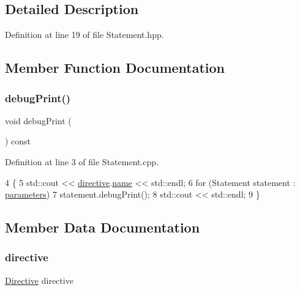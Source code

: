 \subsection{Detailed Description}


Definition at line 19 of file Statement.\+hpp.



\subsection{Member Function Documentation}
\mbox{\label{classft_1_1_statement_ad5cb0ada03653eb2e1c8947f05c07ad6}} 
\subsubsection{\texorpdfstring{debug\+Print()}{debugPrint()}}
{\footnotesize\ttfamily void debug\+Print (\begin{DoxyParamCaption}{ }\end{DoxyParamCaption}) const}



Definition at line 3 of file Statement.\+cpp.


\begin{DoxyCode}
4     \{
5         std::cout << \hyperlink{classft_1_1_statement_a0ab2276aaeac8d93ba6642c22ded7ba9}{directive}.\hyperlink{classft_1_1_directive_a9b45b3e13bd9167aab02e17e08916231}{name} << std::endl;
6         \textcolor{keywordflow}{for} (Statement statement : \hyperlink{classft_1_1_statement_aa3968f0789a0c0354fd565636082d043}{parameters})
7             statement.debugPrint();
8         std::cout << std::endl;
9     \}
\end{DoxyCode}


\subsection{Member Data Documentation}
\mbox{\label{classft_1_1_statement_a0ab2276aaeac8d93ba6642c22ded7ba9}} 
\subsubsection{\texorpdfstring{directive}{directive}}
{\footnotesize\ttfamily \hyperlink{classft_1_1_directive}{Directive} directive}




